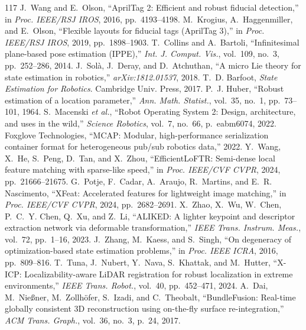\documentclass[10pt,journal]{IEEEtran}
\begin{document}
{\begin{thebibliography}{117}
 J.~Wang and E.~Olson, ``AprilTag 2: Efficient and robust fiducial detection,'' in \emph{Proc. IEEE/RSJ IROS}, 2016, pp.~4193--4198.
 M.~Krogius, A.~Haggenmiller, and E.~Olson, ``Flexible layouts for fiducial tags (AprilTag 3),'' in \emph{Proc. IEEE/RSJ IROS}, 2019, pp.~1898--1903.
 T.~Collins and A.~Bartoli, ``Infinitesimal plane-based pose estimation (IPPE),'' \emph{Int. J. Comput. Vis.}, vol.~109, no.~3, pp.~252--286, 2014.
 J.~Sol\`a, J.~Deray, and D.~Atchuthan, ``A micro Lie theory for state estimation in robotics,'' \emph{arXiv:1812.01537}, 2018.
 T.~D. Barfoot, \emph{State Estimation for Robotics}. Cambridge Univ. Press, 2017.
 P.~J. Huber, ``Robust estimation of a location parameter,'' \emph{Ann. Math. Statist.}, vol.~35, no.~1, pp.~73--101, 1964.
 S.~Macenski \emph{et al.}, ``Robot Operating System 2: Design, architecture, and uses in the wild,'' \emph{Science Robotics}, vol.~7, no.~66, p.~eabm6074, 2022.
 Foxglove Technologies, ``MCAP: Modular, high-performance serialization container format for heterogeneous pub/sub robotics data,'' 2022.
 Y.~Wang, X.~He, S.~Peng, D.~Tan, and X.~Zhou, ``EfficientLoFTR: Semi-dense local feature matching with sparse-like speed,'' in \emph{Proc. IEEE/CVF CVPR}, 2024, pp.~21666--21675.
 G.~Potje, F.~Cadar, A.~Araujo, R.~Martins, and E.~R. Nascimento, ``XFeat: Accelerated features for lightweight image matching,'' in \emph{Proc. IEEE/CVF CVPR}, 2024, pp.~2682--2691.
 X.~Zhao, X.~Wu, W.~Chen, P.~C.~Y. Chen, Q.~Xu, and Z.~Li, ``ALIKED: A lighter keypoint and descriptor extraction network via deformable transformation,'' \emph{IEEE Trans. Instrum. Meas.}, vol.~72, pp.~1--16, 2023.
 J.~Zhang, M.~Kaess, and S.~Singh, ``On degeneracy of optimization-based state estimation problems,'' in \emph{Proc. IEEE ICRA}, 2016, pp.~809--816.
 T.~Tuna, J.~Nubert, Y.~Nava, S.~Khattak, and M.~Hutter, ``X-ICP: Localizability-aware LiDAR registration for robust localization in extreme environments,'' \emph{IEEE Trans. Robot.}, vol.~40, pp.~452--471, 2024.
 A.~Dai, M.~Nie{\ss}ner, M.~Zollh\"ofer, S.~Izadi, and C.~Theobalt, ``BundleFusion: Real-time globally consistent 3D reconstruction using on-the-fly surface re-integration,'' \emph{ACM Trans. Graph.}, vol.~36, no.~3, p.~24, 2017.
\end{thebibliography}}
\end{document}

